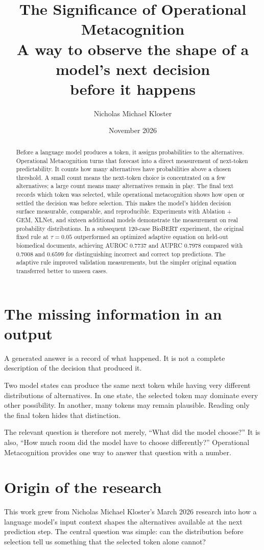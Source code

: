 \documentclass[11pt,a4paper]{article}
\title{\textbf{The Significance of Operational Metacognition}\\[5pt]
\large A way to observe the shape of a model's next decision\\before it happens}
\author{Nicholas Michael Kloster}
\date{November 2026}
\begin{document}
\maketitle
\thispagestyle{fancy}

\begin{abstract}
Before a language model produces a token, it assigns probabilities to the alternatives. Operational Metacognition turns that forecast into a direct measurement of next-token predictability. It counts how many alternatives have probabilities above a chosen threshold. A small count means the next-token choice is concentrated on a few alternatives; a large count means many alternatives remain in play. The final text records which token was selected, while operational metacognition shows how open or settled the decision was before selection. This makes the model's hidden decision surface measurable, comparable, and reproducible. Experiments with Ablation + GEM, XLNet, and sixteen additional models demonstrate the measurement on real probability distributions. In a subsequent 120-case BioBERT experiment, the original fixed rule at $\tau=0.05$ outperformed an optimized adaptive equation on held-out biomedical documents, achieving AUROC $0.7737$ and AUPRC $0.7978$ compared with $0.7008$ and $0.6599$ for distinguishing incorrect and correct top predictions. The adaptive rule improved validation measurements, but the simpler original equation transferred better to unseen cases.
\end{abstract}

\section{The missing information in an output}
A generated answer is a record of what happened. It is not a complete description of the decision that produced it.

Two model states can produce the same next token while having very different distributions of alternatives. In one state, the selected token may dominate every other possibility. In another, many tokens may remain plausible. Reading only the final token hides that distinction.

The relevant question is therefore not merely, ``What did the model choose?'' It is also, ``How much room did the model have to choose differently?'' Operational Metacognition provides one way to answer that question with a number.

\section{Origin of the research}
This work grew from Nicholas Michael Kloster's March 2026 research into how a language model's input context shapes the alternatives available at the next prediction step. The central question was simple: can the distribution before selection tell us something that the selected token alone cannot?
\end{document}
